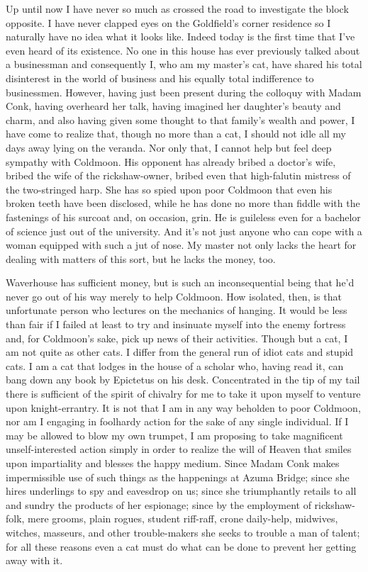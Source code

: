 \documentclass[12pt, openright]{book}
\begin{document}
Up until now I have never so much as crossed the road to investigate the
block opposite. I have never clapped eyes on the Goldfield's corner
residence so I naturally have no idea what it looks like. Indeed today
is the first time that I've even heard of its existence. No one in this
house has ever previously talked about a businessman and consequently I,
who am my master's cat, have shared his total disinterest in the world
of business and his equally total indifference to businessmen. However,
having just been present during the colloquy with Madam Conk, having
overheard her talk, having imagined her daughter's beauty and charm, and
also having given some thought to that family's wealth and power, I have
come to realize that, though no more than a cat, I should not idle all
my days away lying on the veranda. Nor only that, I cannot help but feel
deep sympathy with Coldmoon. His opponent has already bribed a doctor's
wife, bribed the wife of the rickshaw-owner, bribed even that
high-falutin mistress of the two-stringed harp. She has so spied upon
poor Coldmoon that even his broken teeth have been disclosed, while he
has done no more than fiddle with the fastenings of his surcoat and, on
occasion, grin. He is guileless even for a bachelor of science just out
of the university. And it's not just anyone who can cope with a woman
equipped with such a jut of nose. My master not only lacks the heart for
dealing with matters of this sort, but he lacks the money, too.

Waverhouse has sufficient money, but is such an inconsequential being
that he'd never go out of his way merely to help Coldmoon. How isolated,
then, is that unfortunate person who lectures on the mechanics of
hanging. It would be less than fair if I failed at least to try and
insinuate myself into the enemy fortress and, for Coldmoon's sake, pick
up news of their activities. Though but a cat, I am not quite as other
cats. I differ from the general run of idiot cats and stupid cats. I am
a cat that lodges in the house of a scholar who, having read it, can
bang down any book by Epictetus on his desk. Concentrated in the tip of
my tail there is sufficient of the spirit of chivalry for me to take it
upon myself to venture upon knight-errantry. It is not that I am in any
way beholden to poor Coldmoon, nor am I engaging in foolhardy action for
the sake of any single individual. If I may be allowed to blow my own
trumpet, I am proposing to take magnificent unself-interested action
simply in order to realize the will of Heaven that smiles upon
impartiality and blesses the happy medium. Since Madam Conk makes
impermissible use of such things as the happenings at Azuma Bridge;
since she hires underlings to spy and eavesdrop on us; since she
triumphantly retails to all and sundry the products of her espionage;
since by the employment of rickshaw-folk, mere grooms, plain rogues,
student riff-raff, crone daily-help, midwives, witches, masseurs, and
other trouble-makers she seeks to trouble a man of talent; for all these
reasons even a cat must do what can be done to prevent her getting away
with it.
\end{document}

